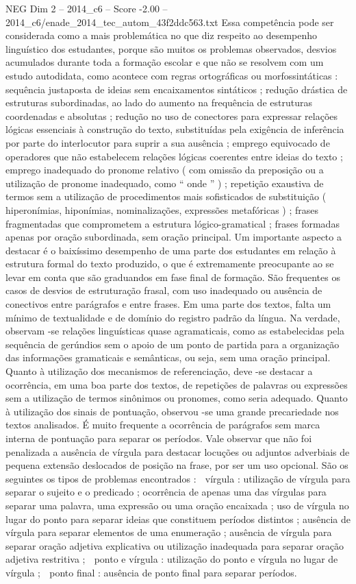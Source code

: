 \begin{textsample}{NEG Dim 2 – 2014\_c6 – Score -2.00 – 2014\_c6/enade\_2014\_tec\_autom\_43f2ddc563.txt}
Essa competência pode ser considerada como a mais problemática no que diz respeito ao desempenho linguístico dos estudantes, porque são muitos os problemas observados, desvios acumulados durante toda a formação escolar e que não se resolvem com um estudo autodidata, como acontece com regras ortográficas ou morfossintáticas : sequência justaposta de ideias sem encaixamentos sintáticos ; redução drástica de estruturas subordinadas, ao lado do aumento na frequência de estruturas coordenadas e absolutas ; redução no uso de conectores para expressar relações lógicas essenciais à construção do texto, substituídas pela exigência de inferência por parte do interlocutor para suprir a sua ausência ; emprego equivocado de operadores que não estabelecem relações lógicas coerentes entre ideias do texto ; emprego inadequado do pronome relativo ( com omissão da preposição ou a utilização de pronome inadequado, como “ onde ” ) ; repetição exaustiva de termos sem a utilização de procedimentos mais sofisticados de substituição ( hiperonímias, hiponímias, nominalizações, expressões metafóricas ) ; frases fragmentadas que comprometem a estrutura lógico-gramatical ; frases formadas apenas por oração subordinada, sem oração principal.
Um importante aspecto a destacar é o baixíssimo desempenho de uma parte dos estudantes em relação à estrutura formal do texto produzido, o que é extremamente preocupante ao se levar em conta que são graduandos em fase final de formação.
São frequentes os casos de desvios de estruturação frasal, com uso inadequado ou ausência de conectivos entre parágrafos e entre frases.
Em uma parte dos textos, falta um mínimo de textualidade e de domínio do registro padrão da língua.
Na verdade, observam -se relações linguísticas quase agramaticais, como as estabelecidas pela sequência de gerúndios sem o apoio de um ponto de partida para a organização das informações gramaticais e semânticas, ou seja, sem uma oração principal.
Quanto à utilização dos mecanismos de referenciação, deve -se destacar a ocorrência, em uma boa parte dos textos, de repetições de palavras ou expressões sem a utilização de termos sinônimos ou pronomes, como seria adequado.
Quanto à utilização dos sinais de pontuação, observou -se uma grande precariedade nos textos analisados.
É muito frequente a ocorrência de parágrafos sem marca interna de pontuação para separar os períodos.
Vale observar que não foi penalizada a ausência de vírgula para destacar locuções ou adjuntos adverbiais de pequena extensão deslocados de posição na frase, por ser um uso opcional.
São os seguintes os tipos de problemas encontrados :  vírgula : utilização de vírgula para separar o sujeito e o predicado ; ocorrência de apenas uma das vírgulas para separar uma palavra, uma expressão ou uma oração encaixada ; uso de vírgula no lugar do ponto para separar ideias que constituem períodos distintos ; ausência de vírgula para separar elementos de uma enumeração ; ausência de vírgula para separar oração adjetiva explicativa ou utilização inadequada para separar oração adjetiva restritiva ;  ponto e vírgula : utilização do ponto e vírgula no lugar de vírgula ;  ponto final : ausência de ponto final para separar períodos.

\end{textsample}
